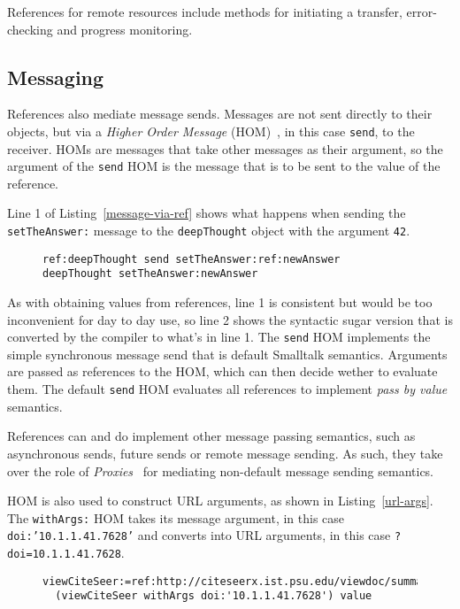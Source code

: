\documentclass[preprint,authoryear]{llncs}
\begin{document}
References for remote resources include methods for initiating a transfer,
error-checking and progress monitoring.  

\subsection{Messaging}

References also mediate message sends.   Messages are not sent directly to their objects, but via a
\emph{Higher Order Message} (HOM)~\cite{HOM}, in this case {\tt send}, to the receiver.    HOMs
are messages that take other messages as their argument, so the argument of the {\tt send} HOM is the
message that is to be sent to the value of the reference.  

  Line 1 of Listing~\ref{message-via-ref} shows
what happens when sending the {\tt setTheAnswer:} message to the {\tt deepThought} object with
the argument {\tt 42}.

\begin{figure}[htbp]
\begin{lstlisting}[style=numbers,label=message-via-ref,caption=Message sending via reference and with syntactic sugar]
ref:deepThought send setTheAnswer:ref:newAnswer
deepThought setTheAnswer:newAnswer
\end{lstlisting}
\end{figure}

As with obtaining values from references, line 1 is consistent but would be too inconvenient for day to day use,
so line 2 shows the syntactic sugar version that is converted by the compiler to what's in line 1.  The {\tt send}
HOM implements the simple synchronous message send that is default Smalltalk semantics.   Arguments
are passed as references to the HOM, which can then decide wether to evaluate them.  The default {\tt send}
HOM evaluates all references to implement \emph{pass by value} semantics.

References can and do implement other message passing semantics, such as asynchronous sends, future
sends or remote message sending.  As such, they take over the role of \emph{Proxies}~\cite{VanCutsemMiller} for mediating non-default
message sending semantics.  


HOM is also used to construct URL arguments, as shown in Listing~\ref{url-args}.  The {\tt withArgs:}
HOM takes its message argument, in this case {\tt doi:'10.1.1.41.7628'} and converts into URL arguments,
in this case {\tt ?doi=10.1.1.41.7628}.

\begin{figure}[htbp]
\begin{lstlisting}[style=L,label=url-args,caption=URL arguments via reference and higher order message.]
  viewCiteSeer:=ref:http://citeseerx.ist.psu.edu/viewdoc/summary.
  (viewCiteSeer withArgs doi:'10.1.1.41.7628') value
\end{lstlisting}
\end{figure}
\end{document}
